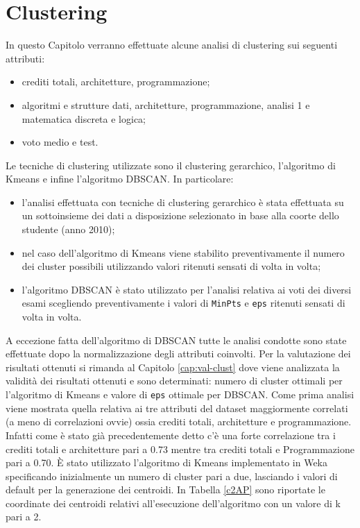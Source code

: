 \documentclass[12pt]{article}
\begin{document}
\section{Clustering}
\label{cap:clust}
In questo Capitolo verranno effettuate alcune analisi di clustering sui se\-guenti attributi:
\begin{itemize}
\item crediti totali, architetture, programmazione;
\item algoritmi e strutture dati, architetture, programmazione, analisi 1 e matematica discreta e logica;
\item voto medio e test.
\end{itemize}
Le tecniche di clustering utilizzate sono il clustering gerarchico, l'algori\-tmo di Kmeans e infine l'algoritmo DBSCAN. In particolare:
\begin{itemize}
\item l'analisi effettuata con tecniche di clustering gerarchico è stata effet\-tuata su un sottoinsieme dei dati a disposizione selezionato in base alla coorte dello studente (anno 2010);
\item nel caso dell'algoritmo di Kmeans viene stabilito preventivamente il numero dei cluster possibili utilizzando valori ritenuti sensati di volta in volta;
\item l'algoritmo DBSCAN è stato utilizzato per l'analisi relativa ai voti dei diversi esami scegliendo preventivamente i valori di \texttt{MinPts} e \texttt{eps} ritenuti sensati di volta in volta.
\end{itemize}
A eccezione fatta dell'algoritmo di DBSCAN tutte le analisi condotte sono state effettuate dopo la normalizzazione degli attributi coinvolti. 
Per la valutazione dei risultati ottenuti si rimanda al Capitolo \ref{cap:val-clust} dove viene ana\-liz\-zata la validità dei risultati ottenuti e sono determinati: 
numero di cluster ottimali per l'algoritmo di Kmeans e valo\-re di \texttt{eps} ottimale per DBSCAN.
Come prima analisi viene mostrata quella relativa ai tre attributi del data\-set maggiormente correlati (a meno di 
correlazioni ovvie) ossia crediti totali, architetture e programmazione.
Infatti come è stato già preceden\-temente detto c'è una forte correlazione tra i crediti totali e architetture pari a 0.73 mentre tra crediti totali e Programmazione pari a 0.70.
È stato utilizzato l'algoritmo di Kmeans implementato in Weka specificando ini\-zialmente un numero di cluster pari a due, lasciando i valori di default per la generazione dei centroidi.
In Tabella \ref{c2AP} sono riporta\-te le coordinate dei centroidi relativi all'esecuzione dell'algoritmo con un valore di k pari a 2.
\end{document}
